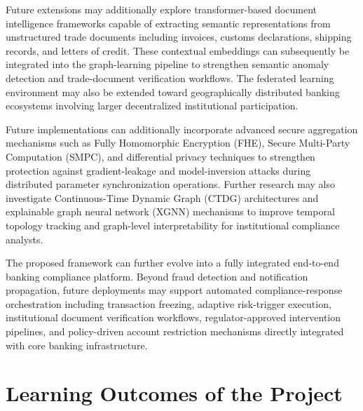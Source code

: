 Future extensions may additionally explore transformer-based document intelligence frameworks capable of extracting semantic representations from unstructured trade documents including invoices, customs declarations, shipping records, and letters of credit. These contextual embeddings can subsequently be integrated into the graph-learning pipeline to strengthen semantic anomaly detection and trade-document verification workflows. The federated learning environment may also be extended toward geographically distributed banking ecosystems involving larger decentralized institutional participation.

Future implementations can additionally incorporate advanced secure aggregation mechanisms such as Fully Homomorphic Encryption (FHE), Secure Multi-Party Computation (SMPC), and differential privacy techniques to strengthen protection against gradient-leakage and model-inversion attacks during distributed parameter synchronization operations. Further research may also investigate Continuous-Time Dynamic Graph (CTDG) architectures and explainable graph neural network (XGNN) mechanisms to improve temporal topology tracking and graph-level interpretability for institutional compliance analysts.

The proposed framework can further evolve into a fully integrated end-to-end banking compliance platform. Beyond fraud detection and notification propagation, future deployments may support automated compliance-response orchestration including transaction freezing, adaptive risk-trigger execution, institutional document verification workflows, regulator-approved intervention pipelines, and policy-driven account restriction mechanisms directly integrated with core banking infrastructure.

\section{Learning Outcomes of the Project}




